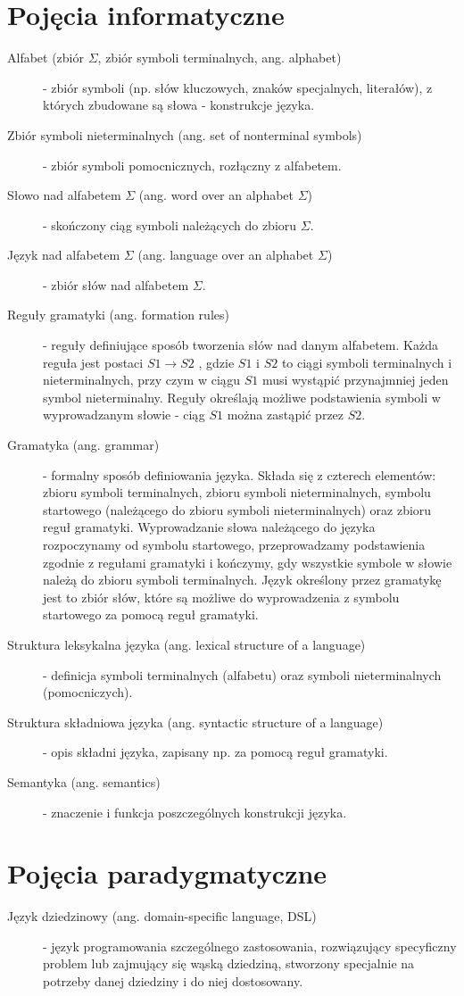 \section{Pojęcia informatyczne}
\begin{description}
 \item[Alfabet (zbiór $\Sigma$, zbiór symboli terminalnych, ang. alphabet)] - zbiór symboli (np. słów kluczowych, znaków specjalnych, literałów), z których zbudowane są słowa - konstrukcje języka.
 \item[Zbiór symboli nieterminalnych (ang. set of nonterminal symbols)] - zbiór symboli pomocnicznych, rozłączny z alfabetem.
 \item[Słowo nad alfabetem $\Sigma$ (ang. word over an alphabet $\Sigma$)] - skończony ciąg symboli należących do zbioru $\Sigma $.
 \item[Język nad alfabetem $\Sigma$ (ang. language over an alphabet $\Sigma$)] - zbiór słów nad alfabetem $\Sigma $.
 \item[Reguły gramatyki (ang. formation rules)] - reguły definiujące sposób tworzenia słów nad danym alfabetem. Każda reguła jest postaci $S1 \rightarrow S2$ , gdzie $S1$ i $S2$ to ciągi symboli terminalnych i nieterminalnych, przy czym w ciągu $S1$ musi wystąpić przynajmniej jeden symbol nieterminalny. Reguły określają możliwe podstawienia symboli w wyprowadzanym słowie - ciąg $S1$ można zastąpić przez $S2$. 
 \item[Gramatyka (ang. grammar)] - formalny sposób definiowania języka. Składa się z czterech elementów: zbioru symboli terminalnych, zbioru symboli nieterminalnych, symbolu startowego (należącego do zbioru symboli nieterminalnych) oraz zbioru reguł gramatyki. Wyprowadzanie słowa należącego do języka rozpoczynamy od symbolu startowego, przeprowadzamy podstawienia zgodnie z regułami gramatyki i kończymy, gdy wszystkie symbole w słowie należą do zbioru symboli terminalnych. Język określony przez gramatykę jest to zbiór słów, które są możliwe do wyprowadzenia z symbolu startowego za pomocą reguł gramatyki.
 \item[Struktura leksykalna języka (ang. lexical structure of a language)] - definicja symboli terminalnych (alfabetu) oraz symboli nieterminalnych (pomocniczych).
 \item[Struktura składniowa języka (ang. syntactic structure of a language)] - opis składni języka, zapisany np. za pomocą reguł gramatyki.
 \item[Semantyka (ang. semantics)] - znaczenie i funkcja poszczególnych konstrukcji języka.
 \end{description}
\section{Pojęcia paradygmatyczne}
\begin{description}
 \item[Język dziedzinowy (ang. domain-specific language, DSL)] - język programowania szczególnego zastosowania, rozwiązujący specyficzny problem lub zajmujący się wąską dziedziną, stworzony specjalnie na potrzeby danej dziedziny i do niej dostosowany.
 
 \end{description}